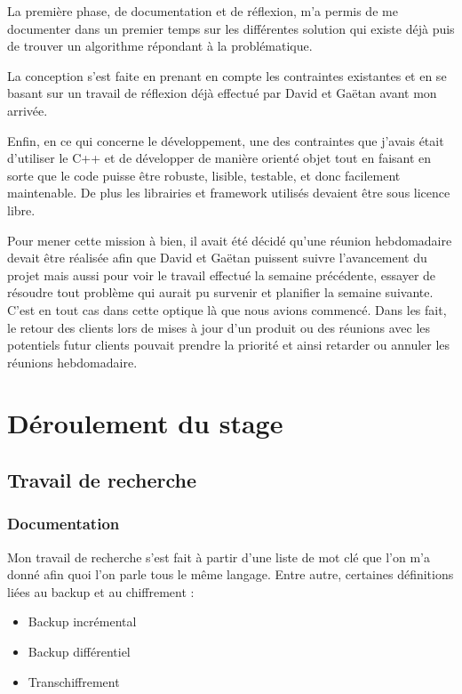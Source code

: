 \documentclass[a4paper,10pt, twoside]{report}
\begin{document}
\begin{spacing}{1.2}
La premi\`ere phase, de documentation et de r\'eflexion, m'a permis de me
documenter dans un premier temps sur les diff\'erentes solution qui existe
d\'ej\`a puis de trouver un algorithme r\'epondant \`a la probl\'ematique.

La conception s'est faite en prenant en compte les contraintes existantes
et en se basant sur un travail de r\'eflexion d\'ej\`a effectu\'e par David et
Ga\"etan avant mon arriv\'ee.

Enfin, en ce qui concerne le d\'eveloppement, une des contraintes que j'avais
\'etait d'utiliser le C++ et de d\'evelopper de mani\`ere orient\'e objet tout
en faisant en sorte que le code puisse \^etre robuste, lisible, testable, et
donc facilement maintenable. De plus les librairies et framework utilis\'es
devaient \^etre sous licence libre.

Pour mener cette mission \`a bien, il avait \'et\'e d\'ecid\'e qu'une r\'eunion
hebdomadaire devait \^etre r\'ealis\'ee afin que David et Ga\"etan puissent
suivre l'avancement du projet mais aussi pour voir le travail effectu\'e la
semaine pr\'ec\'edente, essayer de r\'esoudre tout probl\`eme qui aurait pu
survenir et planifier la semaine suivante.
C'est en tout cas dans cette optique l\`a que nous avions commenc\'e. Dans les
fait, le retour des clients lors de mises \`a jour d'un produit ou des
r\'eunions avec les potentiels futur clients pouvait prendre la priorit\'e et
ainsi retarder ou annuler les r\'eunions hebdomadaire.

\section{D\'eroulement du stage}
\subsection{Travail de recherche}
\subsubsection{Documentation}
Mon travail de recherche s'est fait \`a partir d'une liste de mot cl\'e que
l'on m'a donn\'e afin quoi l'on parle tous le m\^eme langage. Entre autre,
certaines d\'efinitions li\'ees au backup et au chiffrement :
\begin{itemize}
 \item Backup incr\'emental
 \item Backup diff\'erentiel
 \item Transchiffrement
\end{itemize}


\end{spacing}
\end{document}
